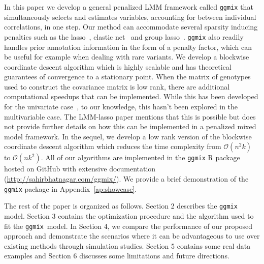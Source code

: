 \documentclass[12pt,letter]{article}\usepackage[]{graphicx}\usepackage[]{color}
\newcommand{\ggmix}{\texttt{ggmix}}
\begin{document}
In this paper we develop a general penalized LMM framework called \texttt{ggmix} that simultaneously selects and estimates variables, accounting for between individual correlations, in one step. Our method can accommodate several sparsity inducing penalties such as the lasso~\citep{tibshirani1996regression}, elastic net~\citep{zou2005regularization} and group lasso~\citep{yuan2006model}. \texttt{ggmix} also readily handles prior annotation information in the form of a penalty factor, which can be useful for example when dealing with rare variants. 
We develop a blockwise coordinate descent algorithm which is highly scalable and has theoretical guarantees of convergence to a stationary point.
When the matrix of genotypes used to construct the covariance matrix is low rank, there are additional computational speedups that can be implemented. 
While this has been developed for the univariate case~\citep{lippert2011fast}, to our knowledge, this hasn't been explored in the multivariable case. 
The LMM-lasso paper mentions that this is possible but does not provide further details on how this can be implemented in a penalized mixed model framework. 
In the sequel, we develop a low rank version of the blockwise coordinate descent algorithm which reduces the time complexity from $\mathcal{O}(n^2k)$ to $\mathcal{O}(nk^2)$.
All of our algorithms are implemented in the \texttt{ggmix} R package hosted on GitHub with extensive documentation (\url{http://sahirbhatnagar.com/ggmix/}). We provide a brief demonstration of the \texttt{ggmix} package in Appendix~\ref{ap:showcase}.

The rest of the paper is organized as follows. Section 2 describes the \texttt{ggmix} model. 
Section 3 contains the optimization procedure and the algorithm used to fit the \ggmix~model. 
In Section 4, we compare the performance of our proposed approach and demonstrate the scenarios where it can be advantageous to use over existing methods through simulation studies. 
Section 5 contains some real data examples and Section 6 discusses some limitations and future directions.




\end{document}
